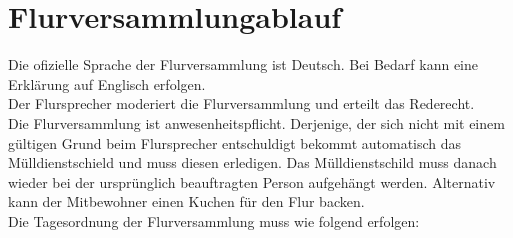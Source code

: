 \documentclass[10pt,a4paper,final]{article}
\begin{document}
\section{Flurversammlungablauf}
Die ofizielle Sprache der Flurversammlung ist Deutsch. Bei Bedarf kann eine Erklärung auf Englisch erfolgen.\\
Der Flursprecher moderiert die Flurversammlung und erteilt das Rederecht.\\
Die Flurversammlung ist anwesenheitspflicht. Derjenige, der sich nicht mit einem gültigen Grund beim Flursprecher entschuldigt bekommt automatisch das Mülldienstschield und muss diesen erledigen. Das Mülldienstschild muss danach wieder bei der ursprünglich beauftragten Person aufgehängt werden. Alternativ kann der Mitbewohner einen Kuchen für den Flur backen.\\

Die Tagesordnung der Flurversammlung muss wie folgend erfolgen:\\
\end{document}
